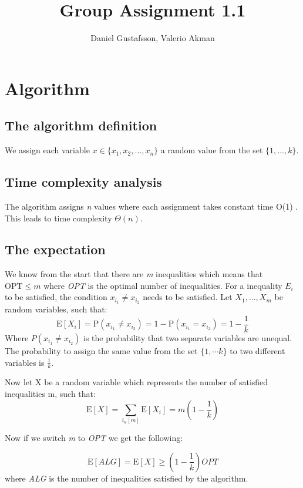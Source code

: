 \documentclass[11pt,a4paper]{article}
\title{Group Assignment 1.1}
\author{Daniel Gustafsson, Valerio Akman}
\begin{document}
\maketitle

\section{Algorithm}
\subsection{The algorithm definition}
We assign each variable $x \in \{x_1, x_2, ... ,x_n\}$ a random value from the set $\{1,...,k\}$.

\subsection{Time complexity analysis}
The algorithm assigns \textit{n} values where each assignment takes constant time O(1) .  This leads to time complexity $\Theta (n)$.

\subsection{The expectation}
We know from the start that there are \textit{m} inequalities which means that $\text{OPT} \leq m$ where \textit{OPT} is the optimal number of inequalities.
For a inequality $E_i$ to be satisfied, the condition $x_{i_1} \ne x_{i_2}$ needs to be satisfied. Let $X_1,...,X_m$ be random variables, such that: 
\[\text{E}[X_i] = \text{P}(x_{i_1} \ne x_{i_2}) = 1 - \text{P}(x_{i_1} = x_{i_2}) = 1 - \frac{1}{k}\]
Where $P(x_{i_1} \ne x_{i_2})$ is the probability that two separate variables are unequal. The probability to assign the same value from the set $\{1, \cdots k\}$ to two different variables is $\frac{1}{k}$.

Now let X be a random variable which represents the number of satisfied inequalities m, such that:
\[\text{E}[X] = \sum_{i_\in [m]} \text{E}[X_i] = m(1 - \frac{1}{k}) \]

Now if we switch \textit{m} to \textit{OPT} we get the following:

\[\text{E}[ALG] = \text{E}[X] \geq (1 - \frac{1}{k})OPT\]
where \textit{ALG} is the number of inequalities satisfied by the algorithm.
\end{document}
